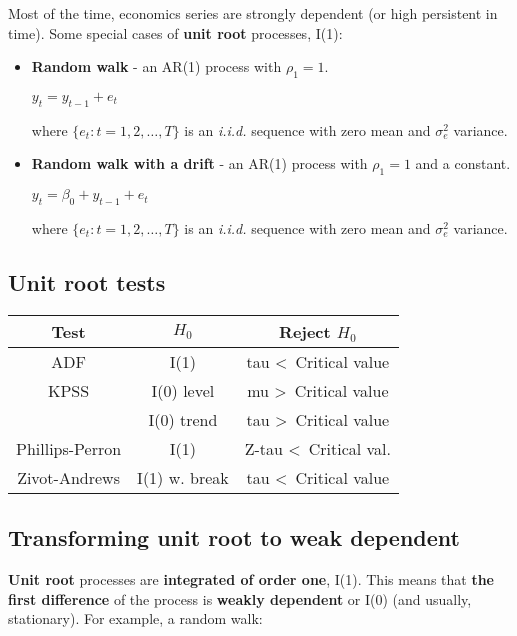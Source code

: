\documentclass[10pt, a4paper, landscape]{extarticle}
\begin{document}
\begin{multicols}{3}
Most of the time, economics series are strongly dependent (or high persistent in time). Some special cases of \textbf{unit root} processes, I(1):

\begin{itemize}[leftmargin=*]
		\item \textbf{Random walk} - an AR(1) process with $\rho_1 = 1$.
	\begin{center}
		$y_t = y_{t - 1} + e_t$
	\end{center}
	where $\lbrace e_t : t = 1, 2, \ldots, T \rbrace$ is an \textsl{i.i.d.} sequence with zero mean and $\sigma^2_e$ variance.
	
	\item \textbf{Random walk with a drift} - an AR(1) process with $\rho_1 = 1$ and a constant.
	\begin{center}
		$y_t = \beta_0 + y_{t - 1} + e_t$
	\end{center}
	where $\lbrace e_t : t = 1, 2, \ldots, T \rbrace$ is an \textsl{i.i.d.} sequence with zero mean and $\sigma^2_e$ variance.
\end{itemize}

\subsection*{Unit root tests}

\begin{center}
	\begin{tabular}{ c | c | c }
		Test            & $H_0$         & Reject $H_0$                       \\ \hline
		ADF             & I(1)          & tau \textless \, Critical value    \\ \hline
		KPSS            & I(0) level    & mu \textgreater \, Critical value  \\
		                & I(0) trend    & tau \textgreater \, Critical value \\ \hline
		Phillips-Perron & I(1)          & Z-tau \textless \, Critical val.   \\ \hline
		Zivot-Andrews   & I(1) w. break & tau \textless \, Critical value
	\end{tabular}
\end{center}

\subsection*{Transforming unit root to weak dependent}

\textbf{Unit root} processes are \textbf{integrated of order one}, I(1). This means that \textbf{the first difference} of the process is \textbf{weakly dependent} or I(0) (and usually, stationary). For example, a random walk:


\end{multicols}
\end{document}
